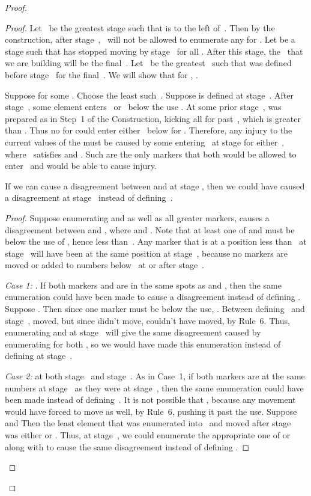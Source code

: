 \documentclass{LMCS}
\newcommand{\0}{\mathbf{0}}
\newcommand{\<}{\langle}
\renewcommand{\>}{\rangle}
\begin{document}
\begin{proof}
\begin{proof}
Let~ be the greatest stage such that  is to the
left of~.  Then by the construction, after
stage~,~ will not be allowed to enumerate any
 for .  Let  be a stage such
that  has stopped moving by stage~ for all .  After this stage, the~ that we are building
will be the final~. Let~ be the greatest~ such that
 was defined before stage~ for the final~.
We will show that for , .


Suppose  for some .  Choose the
least such~.  Suppose  is defined at stage~.  After
stage~, some element enters~ or~ below the use .  At
some prior stage~,  was prepared as in Step~1 of the
Construction, kicking all  for  past~, which is
greater than .  Thus no  for  could enter
either~ below  for .  Therefore, any injury to the
current values of the  must be caused by some
 entering~ at stage  for either~, where~
satisfies  and .
Such  are the only markers that both would be allowed to
enter~ and would be able to cause injury.

\begin{clm}\label{cl:dis}
If we can cause a disagreement between  and
 at stage , then we could have caused a
disagreement at stage~ instead of defining~.
\end{clm}

\begin{proof}
Suppose enumerating  and  as well as all
greater markers, causes a disagreement between  and
, where  and .  Note that at least one of
 and  must be below the use of ,
hence less than~.  Any marker that is at a position less than~
at stage~ will have been at the same position at stage~, because no
markers are moved or added to numbers below~ at or after stage~.

\smallskip
{\em Case 1:} .  If both markers  and 
are in the same spots as  and , then the same
enumeration could have been made to cause a disagreement instead of defining
.  Suppose .  Then since one
marker must be below the use, .  Between
defining~ and stage~,  moved, but since
 didn't move,  couldn't have moved, by
Rule~6.  Thus, enumerating  and  at stage~
will give the same disagreement caused by enumerating  for
both , so we would have made this enumeration instead of defining
 at stage~.

\smallskip
{\em Case 2:}  at both stage~ and stage~.  As in Case~1, if
both markers are at the same numbers at stage~ as they were at stage~,
then the same enumeration could have been made instead of
defining~. It is not possible that , because any movement would have forced  to
move as well, by Rule~6, pushing it past the use.  Suppose  and   Then the least element
that was enumerated into~ and moved after stage~ was either
 or .  Thus, at stage~, we could enumerate
the appropriate one of  or  along with
 to cause the same disagreement instead of defining
.


\end{proof}
\end{proof}
\end{proof}
\end{document}

